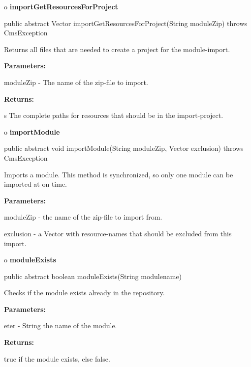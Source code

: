 o {\bf importGetResourcesForProject} 

\begin{PRE}
 public abstract Vector importGetResourcesForProject(String moduleZip) throws CmsException
\end{PRE}

\begin{description}
\htmlDD Returns all files that are needed to create a project for the
module-import. 

\begin{description}
\item {\bf Parameters:}  

moduleZip - The name of the zip-file to import.  
\item {\bf Returns:}  

s The complete paths for resources that should be in the import-project.  
\end{description}

\end{description}

o {\bf importModule} 

\begin{PRE}
 public abstract void importModule(String moduleZip,
                                   Vector exclusion) throws CmsException
\end{PRE}

\begin{description}
\htmlDD Imports a module. This method is synchronized, so only one module can
be imported at on time. 

\begin{description}
\item {\bf Parameters:}  

moduleZip - the name of the zip-file to import from.  

exclusion - a Vector with resource-names that should be excluded from this
import.  
\end{description}

\end{description}

o {\bf moduleExists} 

\begin{PRE}
 public abstract boolean moduleExists(String modulename)
\end{PRE}

\begin{description}
\htmlDD Checks if the module exists already in the repository. 

\begin{description}
\item {\bf Parameters:}  

eter - String the name of the module.  
\item {\bf Returns:}  

true if the module exists, else false.  
\end{description}

\end{description}

